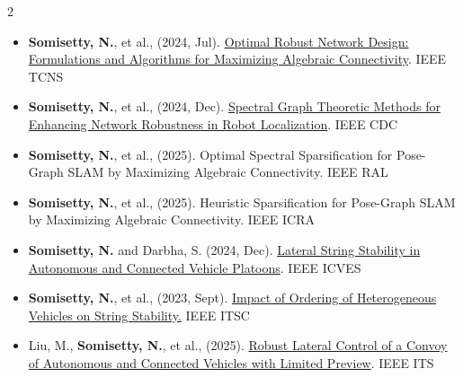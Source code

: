 \documentclass[10pt,a4paper,ragged2e,withhyper]{altacv}
\begin{document}
\begin{paracol}{2}
\begin{itemize}
    \item \textbf{Somisetty, N.}, et al., (2024, Jul). {\color{OxfordBlue}\href{https://ieeexplore.ieee.org/abstract/document/10605101}{{Optimal Robust Network Design: Formulations and Algorithms for Maximizing Algebraic Connectivity}}}. IEEE TCNS
    \vspace{-0.3em}
    \item \textbf{Somisetty, N.}, et al., (2024, Dec). {\color{OxfordBlue}\href{https://arxiv.org/abs/2409.15506}{Spectral Graph Theoretic Methods for Enhancing Network Robustness in Robot Localization}}. IEEE CDC
    \vspace{-0.3em}
    \item \textbf{Somisetty, N.}, et al., (2025). Optimal Spectral Sparsification for Pose-Graph SLAM by Maximizing Algebraic Connectivity. IEEE RAL
    \vspace{-0.3em}
    \item \textbf{Somisetty, N.}, et al., (2025). Heuristic Sparsification for Pose-Graph SLAM by Maximizing Algebraic Connectivity. IEEE ICRA
    \vspace{-0.3em}
    \item \textbf{Somisetty, N.} and Darbha, S. (2024, Dec). {\color{OxfordBlue}\href{https://arxiv.org/abs/2411.07540}{Lateral String Stability in Autonomous and Connected Vehicle Platoons}}. IEEE ICVES
    \vspace{-0.3em}
    \item \textbf{Somisetty, N.}, et al., (2023, Sept). {\color{OxfordBlue}\href{https://ieeexplore.ieee.org/abstract/document/10422222}{Impact of Ordering of Heterogeneous Vehicles on String Stability.}} IEEE ITSC
    \vspace{-0.3em}
    \item  Liu, M., \textbf{Somisetty, N.}, et al., (2025). {\color{OxfordBlue}\href{https://arxiv.org/abs/2011.03587}{Robust Lateral Control of a Convoy of Autonomous and Connected Vehicles with Limited Preview}}. IEEE ITS
    \vspace{-0.25em}
\end{itemize}


\switchcolumn
\vspace{-0.45em}
\vspace{-0.5em}


\end{paracol}
\end{document}
